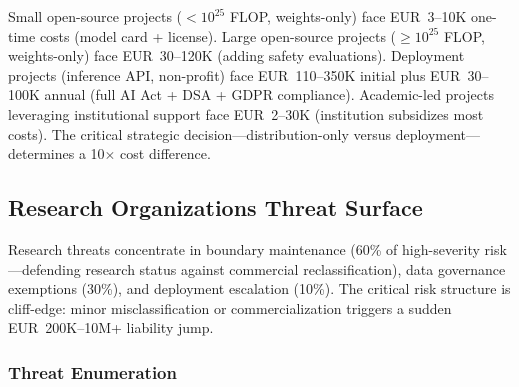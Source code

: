 \documentclass[11pt,a4paper]{article}
\begin{document}
Small open-source projects ($<10^{25}$ FLOP, weights-only) face EUR~3--10K one-time costs (model card + license). Large open-source projects ($\geq 10^{25}$ FLOP, weights-only) face EUR~30--120K (adding safety evaluations). Deployment projects (inference API, non-profit) face EUR~110--350K initial plus EUR~30--100K annual (full AI Act + DSA + GDPR compliance). Academic-led projects leveraging institutional support face EUR~2--30K (institution subsidizes most costs). The critical strategic decision---distribution-only versus deployment---determines a 10$\times$ cost difference.


\subsection{Research Organizations Threat Surface}

Research threats concentrate in boundary maintenance (60\% of high-severity risk---defending research status against commercial reclassification), data governance exemptions (30\%), and deployment escalation (10\%). The critical risk structure is cliff-edge: minor misclassification or commercialization triggers a sudden EUR~200K--10M+ liability jump.

\subsubsection{Threat Enumeration}
\end{document}
